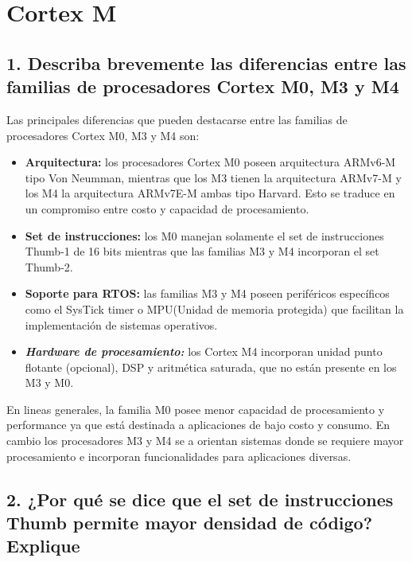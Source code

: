 \documentclass[10pt,a4paper,twoside,spanish]{article}	%
\begin{document}
\section*{Cortex M}

\subsection*{1. Describa brevemente las diferencias entre las familias de procesadores Cortex M0, M3 y M4}

Las principales diferencias que pueden destacarse entre las familias de procesadores Cortex M0, M3 y M4 son:

\begin{itemize}
\item \textbf{Arquitectura:} los procesadores Cortex M0 poseen arquitectura ARMv6-M tipo Von Neumman, mientras que los M3 tienen la arquitectura ARMv7-M y los M4 la arquitectura ARMv7E-M ambas tipo Harvard. Esto se traduce en un compromiso entre costo y capacidad de procesamiento.

\item \textbf{Set de instrucciones:} los M0 manejan solamente el set de instrucciones Thumb-1 de 16 bits mientras que las familias M3 y M4 incorporan el set Thumb-2. 

\item \textbf{Soporte para RTOS:} las familias M3 y M4 poseen periféricos específicos como el SysTick timer o MPU(Unidad de memoria protegida) que facilitan la implementación de sistemas operativos. 

\item \textbf{\textit{Hardware de procesamiento:}} los Cortex M4 incorporan unidad punto flotante (opcional), DSP y aritmética saturada, que no están presente en los M3 y M0.   

\end{itemize}

En lineas generales, la familia M0 posee menor capacidad de procesamiento y performance ya que está destinada a aplicaciones de bajo costo y consumo. En cambio los procesadores M3 y M4 se a orientan sistemas donde se requiere mayor procesamiento e incorporan funcionalidades para aplicaciones diversas.

\subsection*{2. ¿Por qué se dice que el set de instrucciones Thumb permite mayor densidad de código? Explique}
\end{document}
